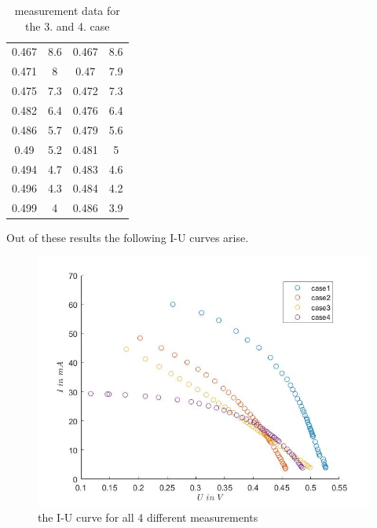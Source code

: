 \documentclass[a4paper, 12pt]{scrartcl}
\begin{document}
\begin{table}[H]
\begin{tabular}{|c|c|c|c|}
0.467	&	8.6	&	0.467	&	8.6\\
0.471	&	8	&	0.47		  &      7.9\\
0.475	&	7.3	&	0.472	&	7.3\\
0.482	&	6.4	&	0.476&		6.4\\
0.486	&	5.7	&	0.479	&	5.6\\
0.49		  &      5.2	&	0.481	&	5\\
0.494		&4.7	&	0.483	&	4.6\\
0.496	&	4.3	&	0.484	&	4.2\\
0.499	&	4	&	0.486	&	3.9\\\hline
\end{tabular}\caption{measurement data for the 3. and 4. case}\end{table}






Out of these results the following I-U curves arise.
\begin{figure}[H]\includegraphics[scale=0.6]{Utot}\caption{the I-U curve for all 4 different measurements}\end{figure}
\end{document}

